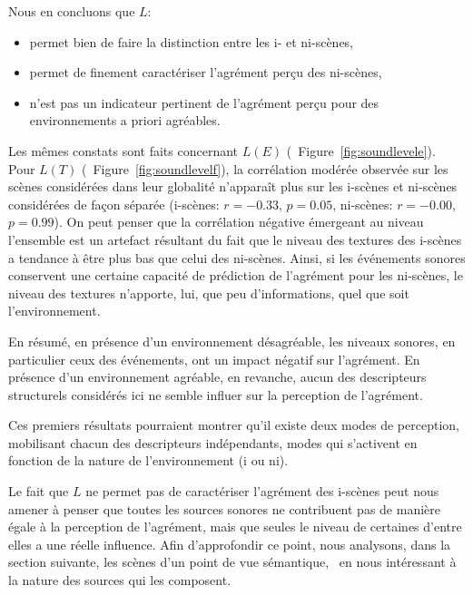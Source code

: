 \documentclass[twoside,twocolumn]{article}
\begin{document}
Nous en concluons que $L$:

\begin{itemize}
\item permet bien de faire la distinction entre les i- et ni-scènes,
\item permet de finement caractériser l'agrément perçu des ni-scènes,
\item n'est pas un indicateur pertinent de l'agrément perçu pour des environnements a priori agréables.
\end{itemize}

Les mêmes constats sont faits concernant $L(E)$ (\cf~Figure~\ref{fig:soundlevele}). Pour $L(T)$ (\cf~Figure~\ref{fig:soundlevelf}), la corrélation modérée observée sur les scènes considérées dans leur globalité n'apparaît plus sur les i-scènes et ni-scènes considérées de façon séparée (i-scènes: $r=-0.33$, $p=0.05$, ni-scènes: $r=-0.00$, $p=0.99$). On peut penser que la corrélation négative émergeant au niveau l'ensemble est un artefact résultant du fait que le niveau des textures des i-scènes a tendance à être plus bas que celui des ni-scènes. Ainsi, si les événements sonores conservent une certaine capacité de prédiction de l'agrément pour les ni-scènes, le niveau des textures n'apporte, lui, que peu d'informations, quel que soit l'environnement.

En résumé, en présence d'un environnement désagréable, les niveaux sonores, en particulier ceux des événements, ont un impact négatif sur l'agrément. En présence d'un environnement agréable, en revanche, aucun des descripteurs structurels considérés ici ne semble influer sur la perception de l'agrément.

Ces premiers résultats pourraient montrer qu'il existe deux modes de perception, mobilisant chacun des descripteurs indépendants, modes qui s'activent en fonction de la nature de l'environnement (i ou ni).

Le fait que $L$ ne permet pas de caractériser l'agrément des i-scènes peut nous amener à penser que toutes les sources sonores ne contribuent pas de manière égale à la perception de l'agrément, mais que seules le niveau de certaines d'entre elles a une réelle influence. Afin d'approfondir ce point, nous analysons, dans la section suivante, les scènes d'un point de vue sémantique, \ie~en nous intéressant à la nature des sources qui les composent.
\end{document}

